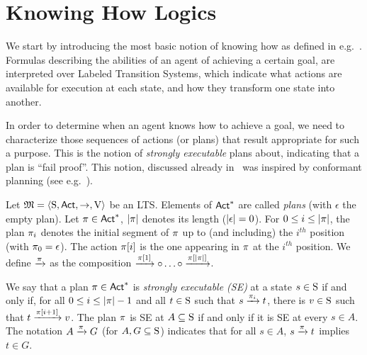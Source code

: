 \section{Knowing How Logics}
\label{sec:khlinearplans}


We start by introducing the most basic notion of knowing how as defined in e.g.~\cite{Wang15lori,Wang16,Wang2016}. Formulas describing the abilities of an agent of achieving a certain goal, are interpreted over Labeled Transition Systems, which indicate what actions are available for execution at each state, and how they transform one state into another.

In order to determine when an agent knows how to achieve a goal, we need to characterize those sequences of actions (or plans) that result appropriate for such a purpose. This is the notion of \emph{strongly executable} plans about, indicating that a plan is ``fail proof''. This notion, discussed already in~\cite{Wang15lori,Wang16,Wang2016} was inspired by conformant planning (see e.g.~\cite{Smith&Weld98,Bonet2010}).

\begin{definition}\label{def:plans}
    Let $\model=\tup{\S,\Act,\ra,\V}$ be an LTS. 
    Elements of $\Act^*$ are called \emph{plans} (with $\epsilon$ the empty plan).  Let $\plan\in\Act^*$, $\size{\plan}$ denotes its length ($\size{\epsilon}=0$).
    For  $0\leq i \leq \size{\plan}$, the plan $\plan_i$ denotes the initial segment of $\plan$ up to (and including) the $i^{th}$ position (with $\plan_0 = \epsilon$). The action $\plan[i]$ is the one appearing in $\plan$ at the $i^{th}$ position. We define $\reach{\plan}$ as the composition $\reach{\plan[1]} \comp \ldots \comp \reach{\plan[\size{\plan}]}$. 

    We say that a plan $\plan\in\Act^*$ is \emph{strongly executable (SE)} at a state $s\in\S$ if and only if, for all $0\leq i \leq \size{\plan}-1$ and all $t\in\S$ such that $s\reach{\plan_i} t$, there is $v\in\S$ such that $t\reach{\plan[i+1]} v$. The plan $\plan$ is SE at $A\subseteq \S$ if and only if it is SE at every $s\in A$. The notation $A \reach{\plan} G$ (for $A,G\subseteq\S$) indicates that for all $s\in A$,  $s\reach{\plan} t$ implies $t\in G$.
\end{definition}

